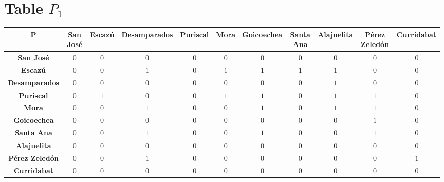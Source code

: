 \documentclass{article}
\begin{document}
\section{Table $P_{1}$}
\begin{center}
    \begin{tabular}{|c||c|c|c|c|c|c|c|c|c|c|}
        \hline
        \textbf{P} & \textbf{San José} & \textbf{Escazú} & \textbf{Desamparados} & \textbf{Puriscal} & \textbf{Mora} & \textbf{Goicoechea} & \textbf{Santa Ana} & \textbf{Alajuelita} & \textbf{Pérez Zeledón} & \textbf{Curridabat} \\
        \hline
        \hline
        \textbf{San José}& 0 & 0 & 0 & 0 & 0 & 0 & 0 & 0 & 0 & 0 \\
        \hline
        \textbf{Escazú}& 0 & 0 & \cellcolor[HTML]{D74894}$1$ & 0 & \cellcolor[HTML]{D74894}$1$ & \cellcolor[HTML]{D74894}$1$ & \cellcolor[HTML]{D74894}$1$ & \cellcolor[HTML]{D74894}$1$ & 0 & 0 \\
        \hline
        \textbf{Desamparados}& 0 & 0 & 0 & 0 & 0 & 0 & 0 & \cellcolor[HTML]{D74894}$1$ & 0 & 0 \\
        \hline
        \textbf{Puriscal}& 0 & \cellcolor[HTML]{D74894}$1$ & 0 & 0 & \cellcolor[HTML]{D74894}$1$ & \cellcolor[HTML]{D74894}$1$ & 0 & \cellcolor[HTML]{D74894}$1$ & \cellcolor[HTML]{D74894}$1$ & 0 \\
        \hline
        \textbf{Mora}& 0 & 0 & \cellcolor[HTML]{D74894}$1$ & 0 & 0 & \cellcolor[HTML]{D74894}$1$ & 0 & \cellcolor[HTML]{D74894}$1$ & \cellcolor[HTML]{D74894}$1$ & 0 \\
        \hline
        \textbf{Goicoechea}& 0 & 0 & 0 & 0 & 0 & 0 & 0 & 0 & \cellcolor[HTML]{D74894}$1$ & 0 \\
        \hline
        \textbf{Santa Ana}& 0 & 0 & \cellcolor[HTML]{D74894}$1$ & 0 & 0 & \cellcolor[HTML]{D74894}$1$ & 0 & 0 & \cellcolor[HTML]{D74894}$1$ & 0 \\
        \hline
        \textbf{Alajuelita}& 0 & 0 & 0 & 0 & 0 & 0 & 0 & 0 & 0 & 0 \\
        \hline
        \textbf{Pérez Zeledón}& 0 & 0 & \cellcolor[HTML]{D74894}$1$ & 0 & 0 & 0 & 0 & 0 & 0 & \cellcolor[HTML]{D74894}$1$ \\
        \hline
        \textbf{Curridabat}& 0 & 0 & 0 & 0 & 0 & 0 & 0 & 0 & 0 & 0 \\
        \hline
    \end{tabular}
\end{center}
\end{document}
